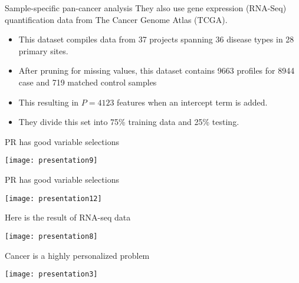 \documentclass[
  10pt,
  ignorenonframetext,
]{beamer}
\begin{document}
\begin{frame}{Sample-specific pan-cancer analysis}
\protect\hypertarget{sample-specific-pan-cancer-analysis}{}
They also use gene expression (RNA-Seq) quantification data from The
Cancer Genome Atlas (TCGA).

\begin{itemize}
\item
  This dataset compiles data from 37 projects spanning 36 disease types
  in 28 primary sites.
\item
  After pruning for missing values, this dataset contains 9663 profiles
  for 8944 case and 719 matched control samples
\item
  This resulting in \(P = 4123\) features when an intercept term is
  added.
\item
  They divide this set into 75\% training data and 25\% testing.
\end{itemize}
\end{frame}

\begin{frame}{PR has good variable selections}
\protect\hypertarget{pr-has-good-variable-selections}{}
\begin{center}\texttt{[image: presentation9]} \end{center}
\end{frame}

\begin{frame}{PR has good variable selections}
\protect\hypertarget{pr-has-good-variable-selections-1}{}
\begin{center}\texttt{[image: presentation12]} \end{center}
\end{frame}

\begin{frame}{Here is the result of RNA-seq data}
\protect\hypertarget{here-is-the-result-of-rna-seq-data}{}
\begin{center}\texttt{[image: presentation8]} \end{center}
\end{frame}

\begin{frame}{Cancer is a highly personalized problem}
\protect\hypertarget{cancer-is-a-highly-personalized-problem}{}
\begin{center}\texttt{[image: presentation3]} \end{center}
\end{frame}
\end{document}
